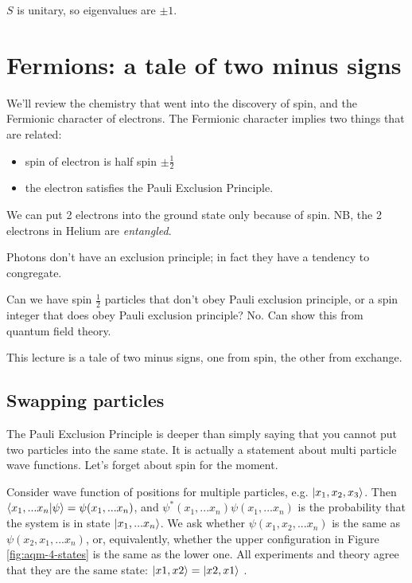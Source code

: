 \documentclass[]{article}
\begin{document}
$S$ is unitary, so eigenvalues are $\pm1$.

\section{Fermions: a tale of two minus signs}


We'll review the chemistry that went into the discovery of spin, and the Fermionic character of electrons. The Fermionic character implies two things that are related:
\begin{itemize}
	\item spin of electron is half spin $\pm \frac{1}{2}$
	\item the electron satisfies the Pauli Exclusion Principle.
\end{itemize} 

We can put 2 electrons into the ground state only because of spin. NB, the 2 electrons in Helium are \textit{entangled}.

Photons don't have an exclusion principle; in fact they have a tendency to congregate.
 
Can we have spin $\frac{1}{2}$ particles that don't obey Pauli exclusion principle, or a spin integer that does obey Pauli exclusion principle? No. Can show this from quantum field theory.

This lecture is a tale of two minus signs, one from spin, the other from exchange.

\subsection{Swapping particles}\label{section:swap}

The Pauli Exclusion Principle is deeper than simply saying that you cannot put two particles into the same state. It is actually a statement about multi particle wave functions. Let's forget about spin for the moment.

Consider wave function of positions for multiple particles, e.g. $\ket{x_1,x_2,x_3}$. Then $\braket{x_1,...x_n|\psi}=\psi(x_1,...x_n)$, and $\psi^*(x_1,...x_n)\psi(x_1,...x_n)$ is the probability that the system is in state $\ket{x_1,...x_n}$. We ask whether $\psi(x_1,x_2,...x_n)$ is the same as $\psi(x_2,x_1,...x_n)$, or, equivalently, whether the upper configuration in Figure \ref{fig:aqm-4-states} is the same as the lower one. All experiments and theory agree that they are the same state: $\ket{x1,x2}=\ket{x2,x1}$ .
\end{document}
